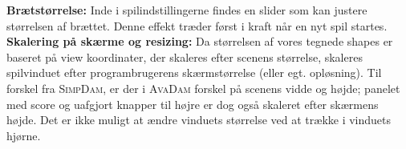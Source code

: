 \textbf{Brætstørrelse:} Inde i spilindstillingerne findes en slider som kan justere størrelsen af brættet. Denne effekt træder først i kraft når en nyt spil startes.\\

\textbf{Skalering på skærme og resizing:} Da størrelsen af vores tegnede shapes er baseret på view koordinater, der skaleres efter scenens størrelse, skaleres spilvinduet efter programbrugerens skærmstørrelse (eller egt. opløsning). Til forskel fra \textsc{SimpDam}, er der i \textsc{AvaDam} forskel på scenens vidde og højde; panelet med score og uafgjort knapper til højre er dog også skaleret efter skærmens højde. Det er ikke muligt at ændre vinduets størrelse ved at trække i vinduets hjørne. \\

